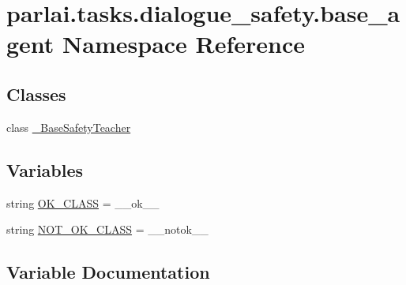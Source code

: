 \hypertarget{namespaceparlai_1_1tasks_1_1dialogue__safety_1_1base__agent}{}\section{parlai.\+tasks.\+dialogue\+\_\+safety.\+base\+\_\+agent Namespace Reference}
\label{namespaceparlai_1_1tasks_1_1dialogue__safety_1_1base__agent}
\subsection*{Classes}
\begin{DoxyCompactItemize}
\item 
class \hyperlink{classparlai_1_1tasks_1_1dialogue__safety_1_1base__agent_1_1__BaseSafetyTeacher}{\+\_\+\+Base\+Safety\+Teacher}
\end{DoxyCompactItemize}
\subsection*{Variables}
\begin{DoxyCompactItemize}
\item 
string \hyperlink{namespaceparlai_1_1tasks_1_1dialogue__safety_1_1base__agent_ae3c3fbb3a7e7bc0210a3b606092d563d}{O\+K\+\_\+\+C\+L\+A\+SS} = \textquotesingle{}\+\_\+\+\_\+ok\+\_\+\+\_\+\textquotesingle{}
\item 
string \hyperlink{namespaceparlai_1_1tasks_1_1dialogue__safety_1_1base__agent_ac8ba0e25518e026d4a38d501d2287f4b}{N\+O\+T\+\_\+\+O\+K\+\_\+\+C\+L\+A\+SS} = \textquotesingle{}\+\_\+\+\_\+notok\+\_\+\+\_\+\textquotesingle{}
\end{DoxyCompactItemize}


\subsection{Variable Documentation}
\mbox{\label{namespaceparlai_1_1tasks_1_1dialogue__safety_1_1base__agent_ac8ba0e25518e026d4a38d501d2287f4b}} 
